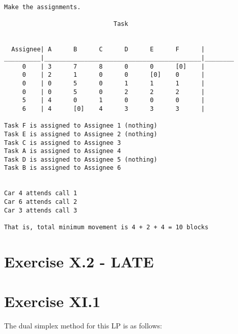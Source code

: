 \documentclass[titlepage, letterpaper]{article}
\begin{document}
\begin{lstlisting}[basicstyle=\tiny]
Make the assignments.

                              Task


  Assignee| A      B      C      D      E      F      |
__________|___________________________________________|________
     0    | 3      7      8      0      0      [0]    | 
     0    | 2      1      0      0      [0]    0      | 
     0    | 0      5      0      1      1      1      | 
     0    | 0      5      0      2      2      2      | 
     5    | 4      0      1      0      0      0      | 
     6    | 4      [0]    4      3      3      3      | 

Task F is assigned to Assignee 1 (nothing)
Task E is assigned to Assignee 2 (nothing)
Task C is assigned to Assignee 3
Task A is assigned to Assignee 4
Task D is assigned to Assignee 5 (nothing)
Task B is assigned to Assignee 6


Car 4 attends call 1
Car 6 attends call 2
Car 3 attends call 3

That is, total minimum movement is 4 + 2 + 4 = 10 blocks
\end{lstlisting}

\section{Exercise X.2 - LATE} %
\label{sec:exercise_x_2}


\section{Exercise XI.1} %
\label{sec:exercise}

The dual simplex method for this LP is as follows:
\end{document}
